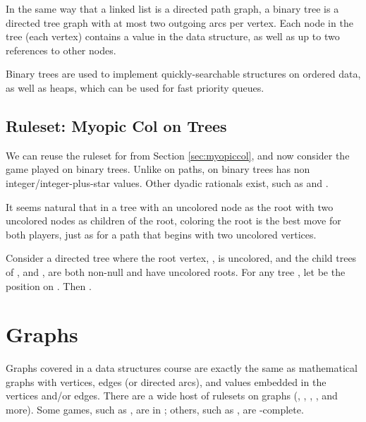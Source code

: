 \documentclass[letter,10pt]{article}
\begin{document}
In the same way that a linked list is a directed path graph, a binary tree is a directed tree graph with at most two outgoing arcs per vertex.  Each node in the tree (each vertex) contains a value in the data structure, as well as up to two references to other nodes.

Binary trees are used to implement quickly-searchable structures on ordered data, as well as heaps, which can be used for fast priority queues.

\subsection{Ruleset: Myopic Col on Trees}

We can reuse the ruleset for  from Section \ref{sec:myopiccol}, and now consider the game played on binary trees.  Unlike on paths,  on binary trees has non integer/integer-plus-star values.  Other dyadic rationals exist, such as  and .

It seems natural that in a tree with an uncolored node as the root with two uncolored nodes as children of the root, coloring the root is the best move for both players, just as for a path that begins with two uncolored vertices.

\begin{conjecture}
    Consider a directed tree  where the root vertex, , is uncolored, and the child trees of ,  and , are both non-null and have uncolored roots.  For any tree , let  be the  position on .  Then .
\end{conjecture}











\section{Graphs}
\label{section:graphs}

Graphs covered in a data structures course are exactly the same as mathematical graphs with vertices, edges (or directed arcs), and values embedded in the vertices and/or edges.  There are a wide host of rulesets on graphs (\cite{ONAG:2001}, , \cite{WinningWays:2001}, \cite{DBLP:journals/tcs/Fukuyama03}, and more).  Some games, such as , are in \cite{DBLP:journals/tcs/FraenkelSU93}; others, such as , are -complete\cite{DBLP:journals/jcss/Schaefer78}.
\end{document}
